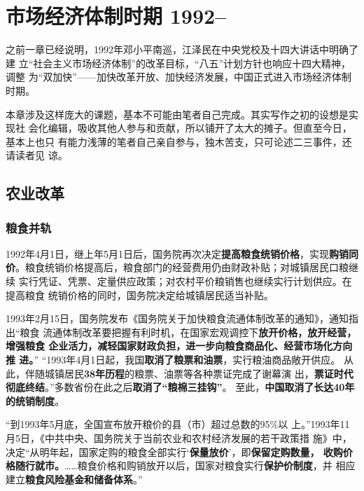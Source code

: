 \chapter{市场经济体制时期 1992--}

之前一章已经说明，1992年邓小平南巡，江泽民在中央党校及十四大讲话中明确了建
立“社会主义市场经济体制”的改革目标，“八五”计划方针也响应十四大精神，调整
为“双加快”——加快改革开放、加快经济发展，中国正式进入市场经济体制时期。

本章涉及这样庞大的课题，基本不可能由笔者自己完成。其实写作之初的设想是实现社
会化编辑，吸收其他人参与和贡献，所以铺开了太大的摊子。但直至今日，基本上也只
有能力浅薄的笔者自己亲自参与，独木苦支，只可论述二三事件，还请读者见
谅。


\section{农业改革}

\subsection{粮食并轨}

1992年4月1日，继上年5月1日后，国务院再次决定\textbf{提高粮食统销价格}，实现\textbf{购销同
  价}。粮食统销价格提高后，粮食部门的经营费用仍由财政补贴；对城镇居民口粮继续
实行凭证、凭票、定量供应政策；对农村平价粮销售也继续实行计划供应。在提高粮食
统销价格的同时，国务院决定给城镇居民适当补贴。

1993年2月15日，国务院发布《国务院关于加快粮食流通体制改革的通知》，通知指出“粮食
流通体制改革要把握有利时机，在国家宏观调控下\textbf{放开价格，放开经营，增强粮食
  企业活力，减轻国家财政负担，进一步向粮食商品化、经营市场化方向推
  进。}” “1993年4月1日起，我国\textbf{取消了粮票和油票}，实行粮油商品敞开供应。
从此，伴随城镇居民\textbf{38年历程}的粮票、油票等各种票证完成了谢幕演
出，\textbf{票证时代彻底终结}。”多数省份在此之后\textbf{取消了“粮棉三挂钩”}。
至此，\textbf{中国取消了长达40年的统销制度}。

“到1993年5月底，全国宣布放开粮价的县（市）超过总数的95\%以
上。”1993年11月5日，《中共中央、国务院关于当前农业和农村经济发展的若干政策措
施》中，决定“从明年起，国家定购的粮食全部实行‘\textbf{保量放价}’，即\textbf{保留定购数量，
收购价格随行就市。}……粮食价格和购销放开以后，国家对粮食实行\textbf{保护价制度}，并
相应建立\textbf{粮食风险基金和储备体系}。”

